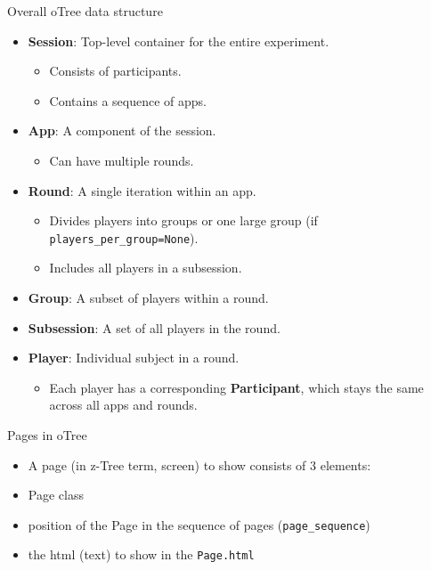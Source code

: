 \documentclass[
  ignorenonframetext,
]{beamer}
\providecommand{\tightlist}{%
  \setlength{\itemsep}{0pt}\setlength{\parskip}{0pt}}
\begin{document}
\begin{frame}[fragile]{Overall oTree data structure}
\label{overall-otree-data-structure}
\scritpsize

\begin{itemize}
\item
  \textbf{Session}: Top-level container for the entire experiment.

  \begin{itemize}
  \tightlist
  \item
    Consists of participants.
  \item
    Contains a sequence of apps.
  \end{itemize}
\item
  \textbf{App}: A component of the session.

  \begin{itemize}
  \tightlist
  \item
    Can have multiple rounds.
  \end{itemize}
\item
  \textbf{Round}: A single iteration within an app.

  \begin{itemize}
  \tightlist
  \item
    Divides players into groups or one large group (if
    \texttt{players\_per\_group=None}).
  \item
    Includes all players in a subsession.
  \end{itemize}
\item
  \textbf{Group}: A subset of players within a round.
\item
  \textbf{Subsession}: A set of all players in the round.
\item
  \textbf{Player}: Individual subject in a round.

  \begin{itemize}
  \tightlist
  \item
    Each player has a corresponding \textbf{Participant}, which stays
    the same across all apps and rounds.
  \end{itemize}
\end{itemize}
\end{frame}

\begin{frame}[fragile]{Pages in oTree}
\label{pages-in-otree}
\begin{itemize}
\tightlist
\item
  A page (in z-Tree term, screen) to show consists of 3 elements:
\item
  Page class
\item
  position of the Page in the sequence of pages
  (\texttt{page\_sequence})
\item
  the html (text) to show in the \texttt{Page.html}
\end{itemize}
\end{frame}
\end{document}
